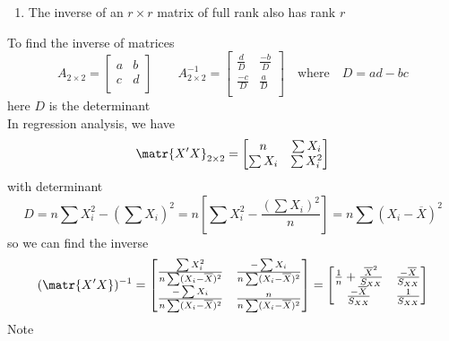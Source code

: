 \documentclass[11pt]{article}
\begin{document}
\begin{defn*}
\begin{enumerate}
\begin{enumerate}
            \item The inverse of an $r\times r$ matrix of full rank also has rank $r$
        \end{enumerate}
        To find the inverse of matrices 
        \[
            A_{2\times 2} = 
            \begin{bmatrix}
                a & b \\
                c & d \\
            \end{bmatrix}
            \quad \quad 
            A_{2\times 2}^{-1} = 
            \begin{bmatrix}
                \frac{d}{D} & \frac{-b}{D} \\
                \frac{-c}{D} & \frac{a}{D} \\ 
            \end{bmatrix}
            \quad 
            \text{where}
            \quad 
            D = ad - bc
        \]        
        here $D$ is the determinant \\
        In regression analysis, we have
        \[
            \matr{X' X}_{2\times 2} = 
            \begin{bmatrix}
                n & \sum X_i \\
                \sum X_i & \sum X_i^2 \\ 
            \end{bmatrix}
        \]
        with determinant
        \[
            D = n\sum X_i^2 - (\sum X_i)^2 = n \left[ \sum X_i^2 - \frac{(\sum X_i)^2}{n} \right] = n \sum (X_i - \overline{X})^2
        \]
        so we can find the inverse 
        \[
            (\matr{X' X})^{-1} = 
            \begin{bmatrix}
                \frac{\sum X_i^2}{n \sum (X_i - \overline{X})^2} & \frac{-\sum X_i}{n \sum(X_i - \overline{X})^2} \\
                \frac{-\sum X_i}{n \sum(X_i - \overline{X})^2} & \frac{n}{n \sum (X_i - \overline{X})^2} \\ 
            \end{bmatrix}
            = 
            \begin{bmatrix}
                \frac{1}{n} + \frac{\overline{X}^2}{S_{XX}} & \frac{-\overline{X}}{S_{XX}} \\
                \frac{-\overline{X}}{S_{XX}} & \frac{1}{S_{XX}} \\ 
            \end{bmatrix}
        \]
        Note
        \[  
\]
\end{enumerate}
\end{defn*}
\end{document}
